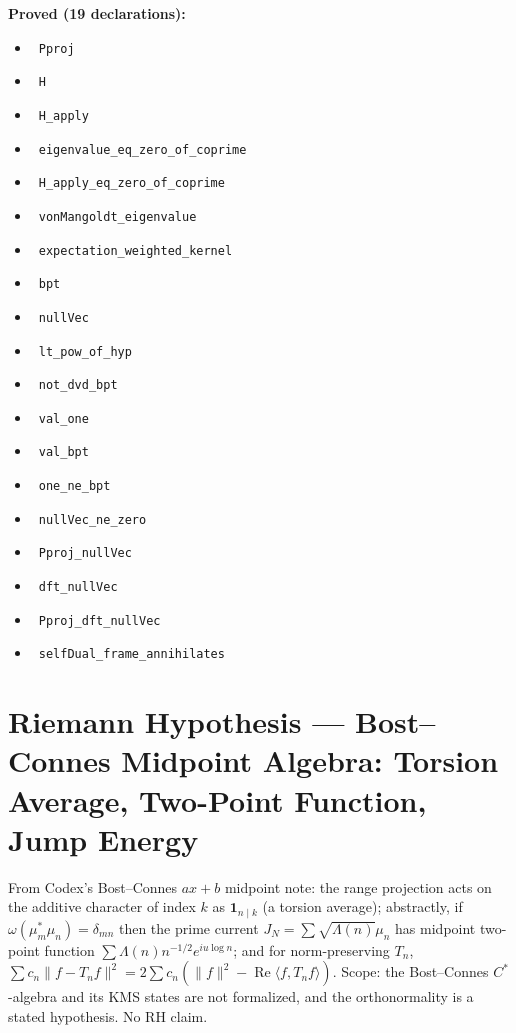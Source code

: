 \documentclass{report}
\theoremstyle{definition}
\begin{document}
\noindent\textbf{Proved (19 declarations):}
\begin{itemize}
  \item {}\leanok\ \texttt{Pproj}
  \item {}\leanok\ \texttt{H}
  \item {}\leanok\ \texttt{H\_apply}
  \item {}\leanok\ \texttt{eigenvalue\_eq\_zero\_of\_coprime}
  \item {}\leanok\ \texttt{H\_apply\_eq\_zero\_of\_coprime}
  \item {}\leanok\ \texttt{vonMangoldt\_eigenvalue}
  \item {}\leanok\ \texttt{expectation\_weighted\_kernel}
  \item {}\leanok\ \texttt{bpt}
  \item {}\leanok\ \texttt{nullVec}
  \item {}\leanok\ \texttt{lt\_pow\_of\_hyp}
  \item {}\leanok\ \texttt{not\_dvd\_bpt}
  \item {}\leanok\ \texttt{val\_one}
  \item {}\leanok\ \texttt{val\_bpt}
  \item {}\leanok\ \texttt{one\_ne\_bpt}
  \item {}\leanok\ \texttt{nullVec\_ne\_zero}
  \item {}\leanok\ \texttt{Pproj\_nullVec}
  \item {}\leanok\ \texttt{dft\_nullVec}
  \item {}\leanok\ \texttt{Pproj\_dft\_nullVec}
  \item {}\leanok\ \texttt{selfDual\_frame\_annihilates}
\end{itemize}

\section{Riemann Hypothesis --- Bost--Connes Midpoint Algebra: Torsion Average, Two-Point Function, Jump Energy}
From Codex's Bost--Connes $ax+b$ midpoint note: the range projection acts on the additive character of index $k$ as $\mathbf 1_{n\mid k}$ (a torsion average); abstractly, if $\omega(\mu_m^*\mu_n)=\delta_{mn}$ then the prime current $J_N=\sum\sqrt{\Lambda(n)}\mu_n$ has midpoint two-point function $\sum\Lambda(n)n^{-1/2}e^{iu\log n}$; and for norm-preserving $T_n$, $\sum c_n\|f-T_nf\|^2=2\sum c_n(\|f\|^2-\operatorname{Re}\langle f,T_nf\rangle)$. Scope: the Bost--Connes $C^*$-algebra and its KMS states are not formalized, and the orthonormality is a stated hypothesis. No RH claim.
\end{document}
